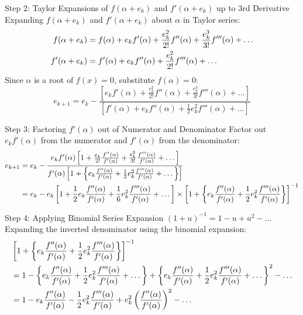 \documentclass[11pt,a4paper]{article}
\begin{document}
\begin{exbox}{Step 2: Taylor Expansions of $f(\alpha + e_k)$ and $f'(\alpha + e_k)$ up to 3rd Derivative}
Expanding $f(\alpha + e_k)$ and $f'(\alpha + e_k)$ about $\alpha$ in Taylor series:
\begin{align}
    f(\alpha + e_k) &= f(\alpha) + e_k f'(\alpha) + \frac{e_k^2}{2!} f''(\alpha) + \frac{e_k^3}{3!} f'''(\alpha) + \dots \notag \\
    f'(\alpha + e_k) &= f'(\alpha) + e_k f''(\alpha) + \frac{e_k^2}{2!} f'''(\alpha) + \dots
\end{align}
Since $\alpha$ is a root of $f(x) = 0$, substitute $f(\alpha) = 0$:
\begin{equation}
    e_{k+1} = e_k - \frac{\left[ e_k f'(\alpha) + \frac{e_k^2}{2!} f''(\alpha) + \frac{e_k^3}{3!} f'''(\alpha) + \dots \right]}{\left[ f'(\alpha) + e_k f''(\alpha) + \frac{1}{2} e_k^2 f'''(\alpha) + \dots \right]}
\end{equation}
\end{exbox}

\newpage

\begin{exbox}{Step 3: Factoring $f'(\alpha)$ out of Numerator and Denominator}
Factor out $e_k f'(\alpha)$ from the numerator and $f'(\alpha)$ from the denominator:
\begin{align}
    e_{k+1} &= e_k - \frac{e_k f'(\alpha) \left[ 1 + \frac{e_k}{2!} \frac{f''(\alpha)}{f'(\alpha)} + \frac{e_k^2}{3!} \frac{f'''(\alpha)}{f'(\alpha)} + \dots \right]}{f'(\alpha) \left[ 1 + \left\{ e_k \frac{f''(\alpha)}{f'(\alpha)} + \frac{1}{2} e_k^2 \frac{f'''(\alpha)}{f'(\alpha)} + \dots \right\} \right]} \notag \\
    &= e_k - e_k \left[ 1 + \frac{1}{2} e_k \frac{f''(\alpha)}{f'(\alpha)} + \frac{1}{6} e_k^2 \frac{f'''(\alpha)}{f'(\alpha)} + \dots \right] \times \left[ 1 + \left\{ e_k \frac{f''(\alpha)}{f'(\alpha)} + \frac{1}{2} e_k^2 \frac{f'''(\alpha)}{f'(\alpha)} \right\} \right]^{-1}
\end{align}
\end{exbox}

\begin{exbox}{Step 4: Applying Binomial Series Expansion $(1 + u)^{-1} = 1 - u + u^2 - \dots$}
Expanding the inverted denominator using the binomial expansion:
\begin{align}
    &\left[ 1 + \left\{ e_k \frac{f''(\alpha)}{f'(\alpha)} + \frac{1}{2} e_k^2 \frac{f'''(\alpha)}{f'(\alpha)} \right\} \right]^{-1} \notag \\
    &= 1 - \left\{ e_k \frac{f''(\alpha)}{f'(\alpha)} + \frac{1}{2} e_k^2 \frac{f'''(\alpha)}{f'(\alpha)} + \dots \right\} + \left\{ e_k \frac{f''(\alpha)}{f'(\alpha)} + \frac{1}{2} e_k^2 \frac{f'''(\alpha)}{f'(\alpha)} + \dots \right\}^2 - \dots \notag \\
    &= 1 - e_k \frac{f''(\alpha)}{f'(\alpha)} - \frac{1}{2} e_k^2 \frac{f'''(\alpha)}{f'(\alpha)} + e_k^2 \left(\frac{f''(\alpha)}{f'(\alpha)}\right)^2 - \dots
\end{align}
\end{exbox}
\end{document}
